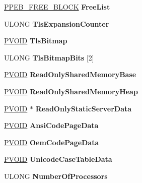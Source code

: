 \begin{DoxyCompactItemize}
\hyperlink{struct___p_e_b___f_r_e_e___b_l_o_c_k}{P\+P\+E\+B\+\_\+\+F\+R\+E\+E\+\_\+\+B\+L\+O\+CK} {\bfseries Free\+List}
\item 
\mbox{\label{struct___p_e_b_a8d02e4f174ef9a558d86a2bf29522463}} 
U\+L\+O\+NG {\bfseries Tls\+Expansion\+Counter}
\item 
\mbox{\label{struct___p_e_b_a626373859c2b0dd44830082217e68705}} 
\hyperlink{interfacevoid}{P\+V\+O\+ID} {\bfseries Tls\+Bitmap}
\item 
\mbox{\label{struct___p_e_b_a3588edea8c5e42e4116e1ee515b00af3}} 
U\+L\+O\+NG {\bfseries Tls\+Bitmap\+Bits} \mbox{[}2\mbox{]}
\item 
\mbox{\label{struct___p_e_b_a8cb4b837bfae167cff1912429042edaa}} 
\hyperlink{interfacevoid}{P\+V\+O\+ID} {\bfseries Read\+Only\+Shared\+Memory\+Base}
\item 
\mbox{\label{struct___p_e_b_a2e43ada4fd5253785311e2ac11671073}} 
\hyperlink{interfacevoid}{P\+V\+O\+ID} {\bfseries Read\+Only\+Shared\+Memory\+Heap}
\item 
\mbox{\label{struct___p_e_b_ab7e87b5a9a640306f22f66832b36f376}} 
\hyperlink{interfacevoid}{P\+V\+O\+ID} $\ast$ {\bfseries Read\+Only\+Static\+Server\+Data}
\item 
\mbox{\label{struct___p_e_b_aa7ae04e9a8c231d93c95230b302aaaaa}} 
\hyperlink{interfacevoid}{P\+V\+O\+ID} {\bfseries Ansi\+Code\+Page\+Data}
\item 
\mbox{\label{struct___p_e_b_ac3f4bc35d7eff4a99ac91b07fe7c386c}} 
\hyperlink{interfacevoid}{P\+V\+O\+ID} {\bfseries Oem\+Code\+Page\+Data}
\item 
\mbox{\label{struct___p_e_b_af996599a84eb58c7790dcb123fe1f12b}} 
\hyperlink{interfacevoid}{P\+V\+O\+ID} {\bfseries Unicode\+Case\+Table\+Data}
\item 
\mbox{\label{struct___p_e_b_a326f5db52f3d1bb2f1d18077331211d8}} 
U\+L\+O\+NG {\bfseries Number\+Of\+Processors}
\item 

\end{DoxyCompactItemize}
